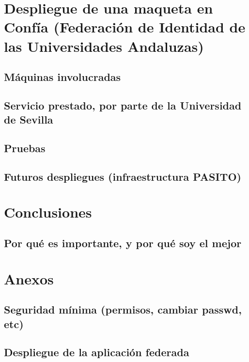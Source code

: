 

\tableofcontents










\chapter{Despliegue de una maqueta en Confía (Federación de Identidad de las Universidades Andaluzas)}
    \section{Máquinas involucradas}
    \section{Servicio prestado, por parte de la Universidad de Sevilla}
    \section{Pruebas}
    \section{Futuros despliegues (infraestructura PASITO)}

\chapter{Conclusiones}
    \section{Por qué es importante, y por qué soy el mejor}

\chapter{Anexos}
    \section{Seguridad mínima (permisos, cambiar passwd, etc)}
    \section{Despliegue de la aplicación federada}

\newpage


